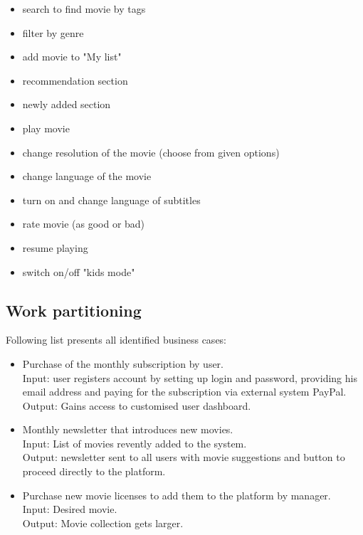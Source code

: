 \documentclass{scrreprt}
\begin{document}
\begin{itemize}
\item search to find movie by tags
\item filter by genre
\item add movie to "My list"
\item recommendation section
\item newly added section
\item play movie
\item change resolution of the movie (choose from given options)
\item change language of the movie
\item turn on and change language of subtitles
\item rate movie (as good or bad)
\item resume playing
\item switch on/off "kids mode"
\end{itemize}

\pagebreak

\subsection{Work partitioning}

Following list presents all identified business cases:

\begin{itemize}
\item Purchase of the monthly subscription by user.
\\Input: user registers account by setting up login and password, providing his email address and paying for the subscription via external system PayPal.
\\Output: Gains access to customised user dashboard.

\item Monthly newsletter that introduces new movies.
\\Input: List of movies revently added to the system.
\\Output: newsletter sent to all users with movie suggestions and button to proceed directly to the platform.

\item Purchase new movie licenses to add them to the platform by manager.
\\Input: Desired movie.
\\Output: Movie collection gets larger.
\end{itemize}
\end{document}
